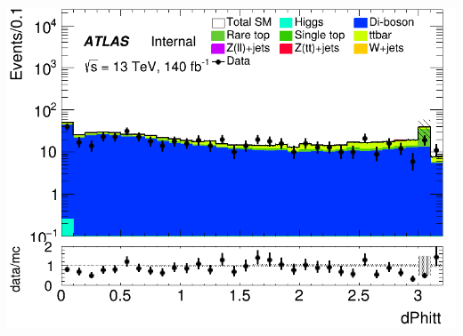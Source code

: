\documentclass[usenames,dvipsnames]{beamer}
\begin{document}
\begin{frame}
\begin{minipage}{0.32\textwidth}
        \includegraphics[width=\textwidth]{graphics/LLL_met/LLL_met_dPhitt.png}
    \end{minipage}
\end{frame}
\end{document}
